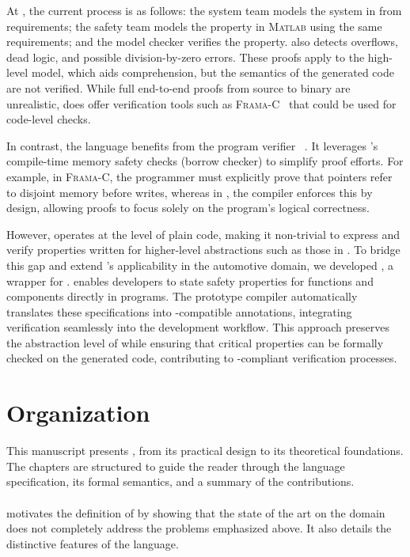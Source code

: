 At \ampere, the current process is as follows: the system team models the system in \Simulink from
requirements; the safety team models the property in \textsc{Matlab} using the same requirements;
and the model checker \sldv verifies the property. \sldv also detects overflows, dead logic, and
possible division-by-zero errors.
%
These proofs apply to the high-level model, which aids comprehension, but the semantics of the
generated \Ci code are not verified. While full end-to-end proofs from source to binary are
unrealistic, \Ci does offer verification tools such as \textsc{Frama-C}~\cite{framac} that could be
used for code-level checks.

In contrast, the \Rust language benefits from the program verifier
\Creusot~\cite{DBLP:conf/icfem/DenisJM22}.
It leverages \Rust's compile-time memory safety checks (borrow checker) to simplify proof efforts.
For example, in \textsc{Frama-C}, the programmer must explicitly prove that pointers refer to
disjoint memory before writes, whereas in \Rust, the compiler enforces this by design, allowing
\Creusot proofs to focus solely on the program's logical correctness.

However, \Creusot operates at the level of plain \Rust code, making it non-trivial to express and
verify properties written for higher-level abstractions such as those in \GRust. To bridge this gap
and extend \GRust's applicability in the automotive domain, we developed \GReusot, a wrapper for
\Creusot.
%
\GReusot enables developers to state safety properties for \GRSync functions and components directly
in \GRust programs.
The prototype compiler automatically translates these specifications into \Rust-compatible
\Creusot annotations, integrating verification seamlessly into the development workflow.
%
This approach preserves the abstraction level of \GRust while ensuring that critical properties can
be formally checked on the generated code, contributing to \iso-compliant verification processes.

\section{Organization}
\label{sec:intro:orga}

This manuscript presents \GRust, from its practical design to its theoretical foundations. The
chapters are structured to guide the reader through the language specification, its formal
semantics, and a summary of the contributions.

\paragraph*{} motivates the definition of \GRust by showing that the state of the art
on the domain does not completely address the problems emphasized above. It also details the
distinctive features of the language.

